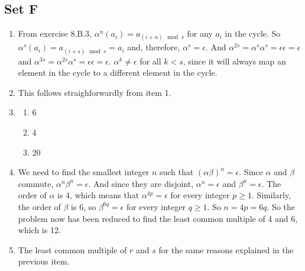\documentclass{article}
\begin{document}
\subsection{Set F}
\begin{enumerate}
    \item From exercise 8.B.3, $\alpha^n(a_i) = a_{(i + n) \mod s}$ for any $a_i$ in the cycle. So $\alpha^s(a_i) = a_{(i + s) \mod s} = a_i$ and, therefore, $\alpha^s = \epsilon$. And $\alpha^{2s} = \alpha^s\alpha^s = \epsilon\epsilon = \epsilon$ and $\alpha^{3s} = \alpha^{2s}\alpha^s = \epsilon\epsilon = \epsilon$. $\alpha^k \ne \epsilon$ for all $k < s$, since it will always map an element in the cycle to a different element in the cycle.

    \item This follows straighforwardly from item 1.

    \item
        \begin{enumerate}[label=(\alph*)]
            \item 6
            \item 4
            \item 20
        \end{enumerate}

    \item We need to find the smallest integer $n$ such that $(\alpha\beta)^n = \epsilon$. Since $\alpha$ and $\beta$ commute, $\alpha^n\beta^n = \epsilon$. And since they are disjoint, $\alpha^n = \epsilon$ and $\beta^n = \epsilon$. The order of $\alpha$ is 4, which means that $\alpha^{4p} = \epsilon$ for every integer $p \geqslant 1$. Similarly, the order of $\beta$ is 6, so $\beta^{6q} = \epsilon$ for every integer $q \geqslant 1$. So $n = 4p = 6q$. So the problem now has been reduced to find the least common multiple of 4 and 6, which is 12.

    \item The least common multiple of $r$ and $s$ for the same reasons explained in the previous item.
\end{enumerate}
\end{document}
